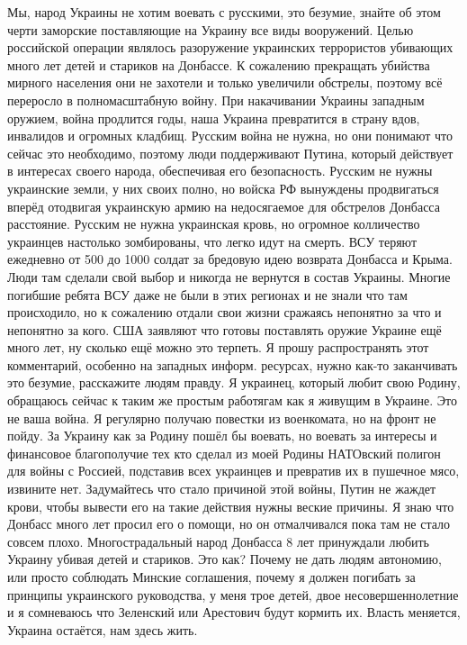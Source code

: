 Мы, народ Украины не хотим воевать с русскими, это безумие, знайте об этом
черти заморские поставляющие на Украину все виды вооружений. Целью российской
операции являлось разоружение украинских террористов убивающих много лет детей
и стариков на Донбассе. К сожалению прекращать убийства мирного населения они
не захотели и только увеличили обстрелы, поэтому всё переросло в
полномасштабную войну. При накачивании Украины западным оружием, война
продлится годы, наша Украина превратится в страну вдов, инвалидов и огромных
кладбищ. Русским война не нужна, но они понимают что сейчас это необходимо,
поэтому люди поддерживают Путина, который действует в интересах своего народа,
обеспечивая его безопасность. Русским не нужны украинские земли, у них своих
полно, но войска РФ вынуждены продвигаться вперёд отодвигая украинскую армию на
недосягаемое для обстрелов Донбасса расстояние. Русским не нужна украинская
кровь, но огромное колличество украинцев настолько зомбированы, что легко идут
на смерть. ВСУ теряют ежедневно от 500 до 1000 солдат за бредовую идею возврата
Донбасса и Крыма. Люди там сделали свой выбор и никогда не вернутся в состав
Украины. Многие погибшие ребята ВСУ даже не были в этих регионах и не знали что
там происходило, но к сожалению отдали свои жизни сражаясь непонятно за что и
непонятно за кого. США заявляют что готовы поставлять оружие Украине ещё много
лет, ну сколько ещё можно это терпеть. Я прошу распространять этот комментарий,
особенно на западных информ. ресурсах, нужно как-то заканчивать это безумие,
расскажите людям правду. Я украинец, который любит свою Родину, обращаюсь
сейчас к таким же простым работягам как я живущим в Украине. Это не ваша война.
Я регулярно получаю повестки из военкомата, но на фронт не пойду. За Украину
как за Родину пошёл бы воевать, но воевать за интересы и финансовое
благополучие тех кто сделал из моей Родины НАТОвский полигон для войны с
Россией, подставив всех украинцев и превратив их в пушечное мясо, извините нет.
Задумайтесь что стало причиной этой войны, Путин не жаждет крови, чтобы вывести
его на такие действия нужны веские причины. Я знаю что Донбасс много лет просил
его о помощи, но он отмалчивался пока там не стало совсем плохо.
Многострадальный народ Донбасса 8 лет принуждали любить Украину убивая детей и
стариков. Это как? Почему не дать людям автономию, или просто соблюдать Минские
соглашения, почему я должен погибать за принципы украинского руководства, у
меня трое детей, двое несовершеннолетние и я сомневаюсь что Зеленский или
Арестович будут кормить их. Власть меняется, Украина остаётся, нам здесь жить.
